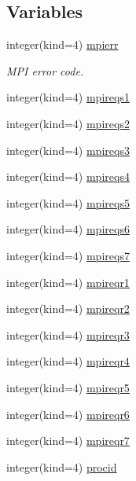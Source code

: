 \subsection*{Variables}
\begin{DoxyCompactItemize}
\item 
integer(kind=4) \hyperlink{namespacemodmpicom_a500c48035640d6e5b49b1b694372bcd3}{mpierr}
\begin{DoxyCompactList}\small\item\em M\+PI error code. \end{DoxyCompactList}\item 
integer(kind=4) \hyperlink{namespacemodmpicom_a34052e13410e6236c45dcfc1b5563200}{mpireqs1}
\item 
integer(kind=4) \hyperlink{namespacemodmpicom_a24670bd8507b230a6be2c2f3afabf5c1}{mpireqs2}
\item 
integer(kind=4) \hyperlink{namespacemodmpicom_a7105e5547fa246381624c998c59249b9}{mpireqs3}
\item 
integer(kind=4) \hyperlink{namespacemodmpicom_a848fe3dd718230ed7fb98e58796619ea}{mpireqs4}
\item 
integer(kind=4) \hyperlink{namespacemodmpicom_a74eac9af638b6438f5a6e0ba77997f33}{mpireqs5}
\item 
integer(kind=4) \hyperlink{namespacemodmpicom_adad671e20507f6639f50d87ec487534b}{mpireqs6}
\item 
integer(kind=4) \hyperlink{namespacemodmpicom_a42cc3c99615d14140b7b8088760ca8bd}{mpireqs7}
\item 
integer(kind=4) \hyperlink{namespacemodmpicom_ac22bfba3e611102e10fdfd1de038f25f}{mpireqr1}
\item 
integer(kind=4) \hyperlink{namespacemodmpicom_a825f1ba2f76e8ca1c71b11f4e7b29815}{mpireqr2}
\item 
integer(kind=4) \hyperlink{namespacemodmpicom_a3d9bf986389786c043540894df1ad003}{mpireqr3}
\item 
integer(kind=4) \hyperlink{namespacemodmpicom_a7a50a2ea228f57406a2f246a57016fa9}{mpireqr4}
\item 
integer(kind=4) \hyperlink{namespacemodmpicom_afd68da48bf63f3f360384fa66e7453bd}{mpireqr5}
\item 
integer(kind=4) \hyperlink{namespacemodmpicom_a9b3e05d2267d77a7a4af942c9db7f204}{mpireqr6}
\item 
integer(kind=4) \hyperlink{namespacemodmpicom_ad55af2a3154bdc4be9156046d29af59d}{mpireqr7}
\item 
integer(kind=4) \hyperlink{namespacemodmpicom_a0a592a5f03c3c0d61e07b5a56fd161d1}{procid}

\end{DoxyCompactItemize}
